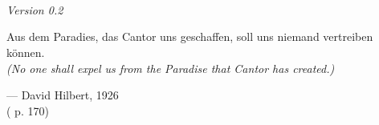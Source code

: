 

\linespread{1.05}

\renewcommand{\thetheorem}{\arabic{part}.\arabic{chapter}.\arabic{section}.\arabic{theorem}}
\renewcommand{\theexercisehidden}{\arabic{part}.\arabic{chapter}.\arabic{exercisehidden}}
\renewcommand{\theproblem}{\arabic{part}.\arabic{chapter}.\arabic{problem}}


\begin{titlepage}
    \\
    \vspace{20mm}
    \\
    \vspace{\fill}
    \centering \large{\the\year}\\
    \centering \small{\textit{Version 0.2}}
\end{titlepage}

\newpage{}
\thispagestyle{empty}

\vspace*{2cm}

\begin{center}
    \Large{\parbox{10cm}{
        \begin{raggedright}
        {
            \large
            Aus dem Paradies, das Cantor uns geschaffen, soll uns niemand vertreiben können.\\
            \textit{(No one shall expel us from the Paradise that Cantor has created.)}
        }

            \vspace{.5cm}
            \hfill{--- David Hilbert, 1926}\\
            \vspace{-.25cm}
            \normalsize
            \hfill{(\cite{hilbert_1926} p. 170)}
        \end{raggedright}
    }
}
\end{center}

